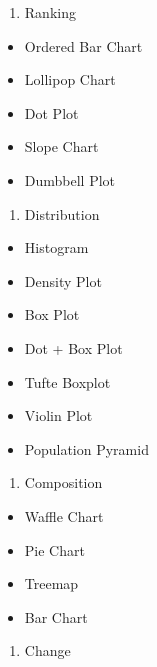 \documentclass[a4paper]{article}
\providecommand{\tightlist}{%
  \setlength{\itemsep}{0pt}\setlength{\parskip}{0pt}}
\begin{document}
\begin{enumerate}
\def\labelenumi{\arabic{enumi}.}
\setcounter{enumi}{2}
\tightlist
\item
  Ranking
\end{enumerate}

\begin{itemize}
\tightlist
\item
  Ordered Bar Chart
\item
  Lollipop Chart
\item
  Dot Plot
\item
  Slope Chart
\item
  Dumbbell Plot
\end{itemize}

\begin{enumerate}
\def\labelenumi{\arabic{enumi}.}
\setcounter{enumi}{3}
\tightlist
\item
  Distribution
\end{enumerate}

\begin{itemize}
\tightlist
\item
  Histogram
\item
  Density Plot
\item
  Box Plot
\item
  Dot + Box Plot
\item
  Tufte Boxplot
\item
  Violin Plot
\item
  Population Pyramid
\end{itemize}

\begin{enumerate}
\def\labelenumi{\arabic{enumi}.}
\setcounter{enumi}{4}
\tightlist
\item
  Composition
\end{enumerate}

\begin{itemize}
\tightlist
\item
  Waffle Chart
\item
  Pie Chart
\item
  Treemap
\item
  Bar Chart
\end{itemize}

\begin{enumerate}
\def\labelenumi{\arabic{enumi}.}
\setcounter{enumi}{5}
\tightlist
\item
  Change
\end{enumerate}
\end{document}
